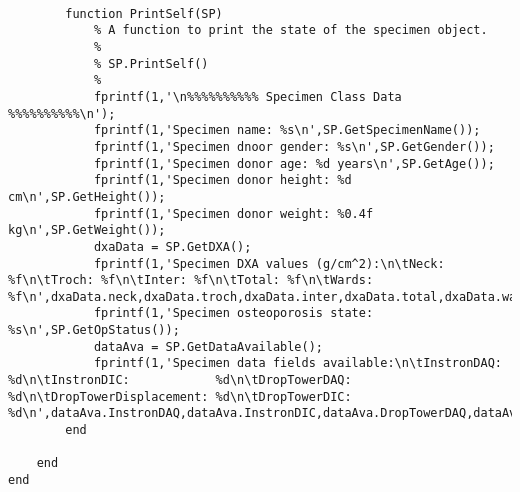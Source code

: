\begin{lstlisting}
        
        function PrintSelf(SP)
            % A function to print the state of the specimen object.
            %
            % SP.PrintSelf()
            %
            fprintf(1,'\n%%%%%%%%%% Specimen Class Data %%%%%%%%%%\n');
            fprintf(1,'Specimen name: %s\n',SP.GetSpecimenName());
            fprintf(1,'Specimen dnoor gender: %s\n',SP.GetGender());
            fprintf(1,'Specimen donor age: %d years\n',SP.GetAge());
            fprintf(1,'Specimen donor height: %d cm\n',SP.GetHeight());
            fprintf(1,'Specimen donor weight: %0.4f kg\n',SP.GetWeight());
            dxaData = SP.GetDXA();
            fprintf(1,'Specimen DXA values (g/cm^2):\n\tNeck:  %f\n\tTroch: %f\n\tInter: %f\n\tTotal: %f\n\tWards: %f\n',dxaData.neck,dxaData.troch,dxaData.inter,dxaData.total,dxaData.wards);
            fprintf(1,'Specimen osteoporosis state: %s\n',SP.GetOpStatus());
            dataAva = SP.GetDataAvailable();
            fprintf(1,'Specimen data fields available:\n\tInstronDAQ:            %d\n\tInstronDIC:            %d\n\tDropTowerDAQ:          %d\n\tDropTowerDisplacement: %d\n\tDropTowerDIC:          %d\n',dataAva.InstronDAQ,dataAva.InstronDIC,dataAva.DropTowerDAQ,dataAva.DropTowerDisplacement,dataAva.DropTowerDIC);
        end
        
    end
end
\end{lstlisting}

